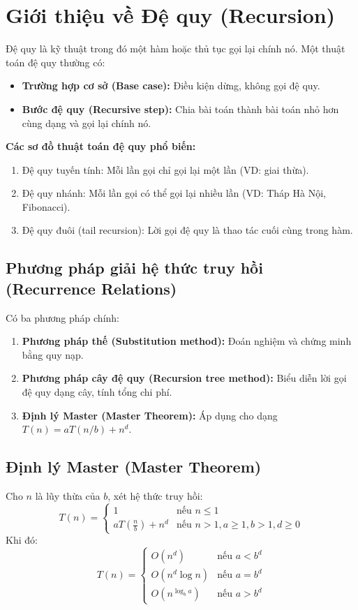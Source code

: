 \documentclass{article}
\begin{document}
\section*{Giới thiệu về Đệ quy (Recursion)}

Đệ quy là kỹ thuật trong đó một hàm hoặc thủ tục gọi lại chính nó. Một thuật toán đệ quy thường có:
\begin{itemize}
    \item \textbf{Trường hợp cơ sở (Base case):} Điều kiện dừng, không gọi đệ quy.
    \item \textbf{Bước đệ quy (Recursive step):} Chia bài toán thành bài toán nhỏ hơn cùng dạng và gọi lại chính nó.
\end{itemize}

\textbf{Các sơ đồ thuật toán đệ quy phổ biến:}
\begin{enumerate}
    \item Đệ quy tuyến tính: Mỗi lần gọi chỉ gọi lại một lần (VD: giai thừa).
    \item Đệ quy nhánh: Mỗi lần gọi có thể gọi lại nhiều lần (VD: Tháp Hà Nội, Fibonacci).
    \item Đệ quy đuôi (tail recursion): Lời gọi đệ quy là thao tác cuối cùng trong hàm.
\end{enumerate}

\subsection*{Phương pháp giải hệ thức truy hồi (Recurrence Relations)}

Có ba phương pháp chính:
\begin{enumerate}
    \item \textbf{Phương pháp thế (Substitution method):} Đoán nghiệm và chứng minh bằng quy nạp.
    \item \textbf{Phương pháp cây đệ quy (Recursion tree method):} Biểu diễn lời gọi đệ quy dạng cây, tính tổng chi phí.
    \item \textbf{Định lý Master (Master Theorem):} Áp dụng cho dạng $T(n) = aT(n/b) + n^d$.
\end{enumerate}

\subsection*{Định lý Master (Master Theorem)}

Cho $n$ là lũy thừa của $b$, xét hệ thức truy hồi:
\[
T(n) = 
\begin{cases} 
1 & \text{nếu } n \le 1 \\
aT\left(\frac{n}{b}\right) + n^d & \text{nếu } n > 1, a \ge 1, b > 1, d \ge 0
\end{cases}
\]
Khi đó:
\[
T(n) = 
\begin{cases} 
O(n^d) & \text{nếu } a < b^d \\
O(n^d \log n) & \text{nếu } a = b^d \\
O(n^{\log_b a}) & \text{nếu } a > b^d
\end{cases}
\]
\end{document}
